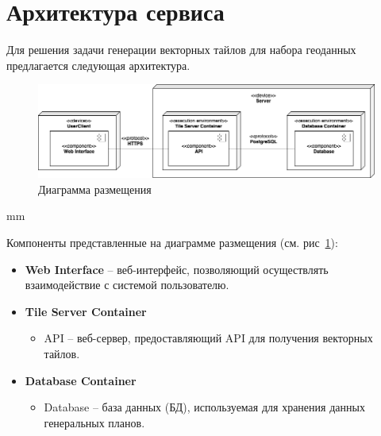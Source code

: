 \section*{\large{Архитектура сервиса}}

Для решения задачи генерации векторных тайлов
для набора геоданных предлагается следующая архитектура.

\begin{figure}[H]
	\hspace*{-1 cm}\includegraphics[width=\textwidth]{images/architecture/1}
	\caption{Диаграмма размещения}
	\label{pic:architecture__deployment-diagram}
\end{figure}
 mm

\noindent Компоненты представленные на диаграмме размещения (см. рис\ \ref{pic:architecture__deployment-diagram}):
\begin{itemize}
	\item \textbf{Web Interface} -- веб-интерфейс, позволяющий осуществлять взаимодействие с системой пользователю.
	\item \textbf{Tile Server Container}
	\begin{itemize}
		\item API -- веб-сервер, предоставляющий API для получения векторных тайлов.
	\end{itemize}
	\item \textbf{Database Container}
	\begin{itemize}
		\item Database -- база данных (БД), используемая для хранения данных генеральных планов.
	\end{itemize}
\end{itemize}

